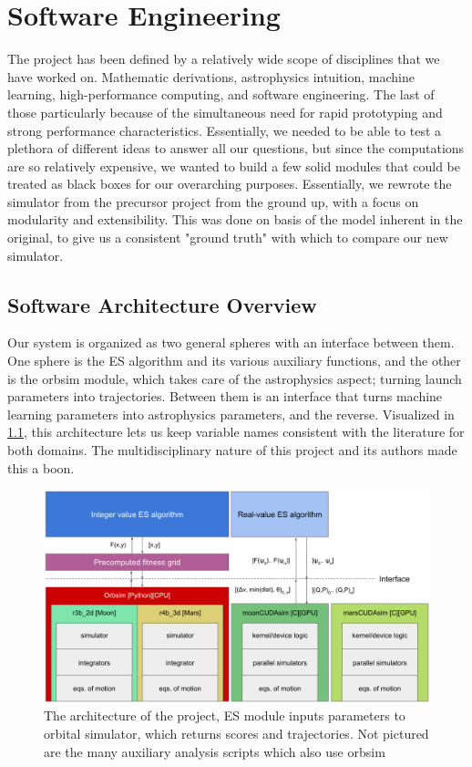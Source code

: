 
\chapter{Software Engineering}

The project has been defined by a relatively wide scope of disciplines that we have worked on. Mathematic derivations, astrophysics intuition, machine learning, high-performance computing, and software engineering. The last of those particularly because of the simultaneous need for rapid prototyping and strong performance characteristics. Essentially, we needed to be able to test a plethora of different ideas to answer all our questions, but since the computations are so relatively expensive, we wanted to build a few solid modules that could be treated as black boxes for our overarching purposes. Essentially, we rewrote the simulator from the precursor project from the ground up, with a focus on modularity and extensibility. This was done on basis of the model inherent in the original, to give us a consistent "ground truth" with which to compare our new simulator.


\section{Software Architecture Overview}
Our system is organized as two general spheres with an interface between them. One sphere is the ES algorithm and its various auxiliary functions, and the other is the orbsim module, which takes care of the astrophysics aspect; turning launch parameters into trajectories. Between them is an interface that turns machine learning parameters into astrophysics parameters, and the reverse. Visualized in \cref{fig:software_architecture}, this architecture lets us keep variable names consistent with the literature for both domains. The multidisciplinary nature of this project and its authors made this a boon.

\begin{figure}
    \centering
    \includegraphics[width=\linewidth]{fig/software_architecture}
    \caption{The architecture of the project, ES module inputs parameters to orbital simulator, which returns scores and trajectories. Not pictured are the many auxiliary analysis scripts which also use orbsim}
    \label{fig:software_architecture}
\end{figure}

